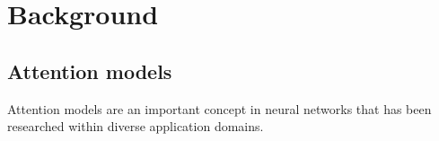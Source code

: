 \chapter{Background}
\label{ch:background}

\section{Attention models}
Attention models are an important concept in neural networks that has
been researched within diverse application domains.


